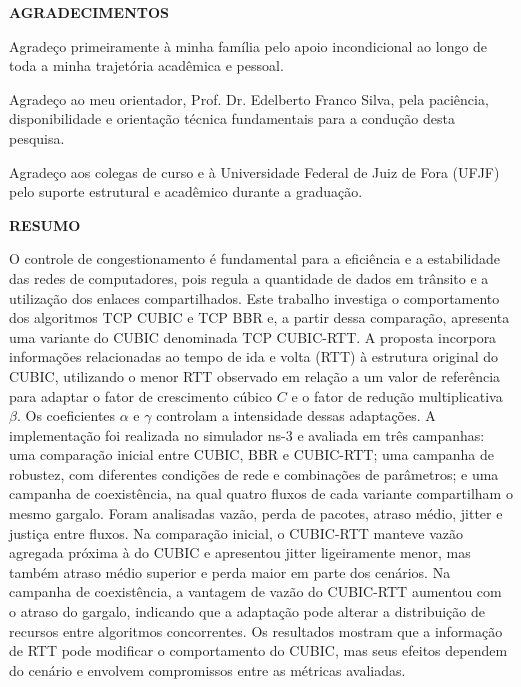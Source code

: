 \documentclass[a4paper,12pt]{monografia}
\begin{document}
\newpage

\begin{center}
    {\large \textbf{AGRADECIMENTOS}}
\end{center}

\vspace{1cm}
\noindent Agradeço primeiramente à minha família pelo apoio incondicional ao longo de toda a minha trajetória acadêmica e pessoal.

\noindent Agradeço ao meu orientador, Prof. Dr. Edelberto Franco Silva, pela paciência, disponibilidade e orientação técnica fundamentais para a condução desta pesquisa.

\noindent Agradeço aos colegas de curso e à Universidade Federal de Juiz de Fora (UFJF) pelo suporte estrutural e acadêmico durante a graduação.

\newpage

\begin{center}
    {\large \textbf{RESUMO}}
\end{center}
O controle de congestionamento é fundamental para a eficiência e a estabilidade das redes de computadores, pois regula a quantidade de dados em trânsito e a utilização dos enlaces compartilhados. Este trabalho investiga o comportamento dos algoritmos TCP CUBIC e TCP BBR e, a partir dessa comparação, apresenta uma variante do CUBIC denominada TCP CUBIC-RTT. A proposta incorpora informações relacionadas ao tempo de ida e volta (RTT) à estrutura original do CUBIC, utilizando o menor RTT observado em relação a um valor de referência para adaptar o fator de crescimento cúbico $C$ e o fator de redução multiplicativa $\beta$. Os coeficientes $\alpha$ e $\gamma$ controlam a intensidade dessas adaptações. A implementação foi realizada no simulador ns-3 e avaliada em três campanhas: uma comparação inicial entre CUBIC, BBR e CUBIC-RTT; uma campanha de robustez, com diferentes condições de rede e combinações de parâmetros; e uma campanha de coexistência, na qual quatro fluxos de cada variante compartilham o mesmo gargalo. Foram analisadas vazão, perda de pacotes, atraso médio, jitter e justiça entre fluxos. Na comparação inicial, o CUBIC-RTT manteve vazão agregada próxima à do CUBIC e apresentou jitter ligeiramente menor, mas também atraso médio superior e perda maior em parte dos cenários. Na campanha de coexistência, a vantagem de vazão do CUBIC-RTT aumentou com o atraso do gargalo, indicando que a adaptação pode alterar a distribuição de recursos entre algoritmos concorrentes. Os resultados mostram que a informação de RTT pode modificar o comportamento do CUBIC, mas seus efeitos dependem do cenário e envolvem compromissos entre as métricas avaliadas.
\end{document}
